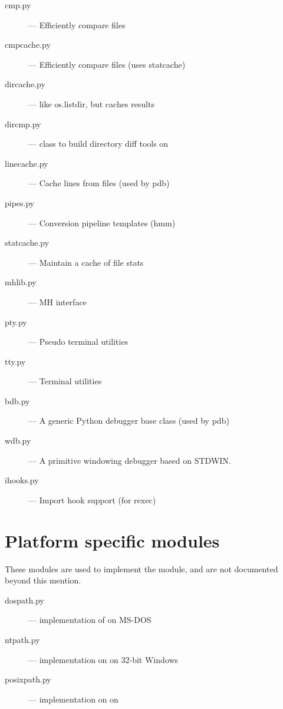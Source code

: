 \begin{description}
\item[cmp.py]
--- Efficiently compare files

\item[cmpcache.py]
--- Efficiently compare files (uses statcache)

\item[dircache.py]
--- like os.listdir, but caches results

\item[dircmp.py]
--- class to build directory diff tools on

\item[linecache.py]
--- Cache lines from files (used by pdb)

\item[pipes.py]
--- Conversion pipeline templates (hmm)

\item[statcache.py]
--- Maintain a cache of file stats

\item[mhlib.py]
--- MH interface

\item[pty.py]
--- Pseudo terminal utilities

\item[tty.py]
--- Terminal utilities

\item[bdb.py]
--- A generic Python debugger base class (used by pdb)

\item[wdb.py]
--- A primitive windowing debugger based on STDWIN.

\item[ihooks.py]
--- Import hook support (for rexec)
\end{description}


\section{Platform specific modules}


These modules are used to implement the  module, and
are not documented beyond this mention.

\begin{description}
\item[dospath.py]
--- implementation of  on MS-DOS

\item[ntpath.py]
--- implementation on  on 32-bit Windows

\item[posixpath.py]
--- implementation on  on \POSIX{}
\end{description}


